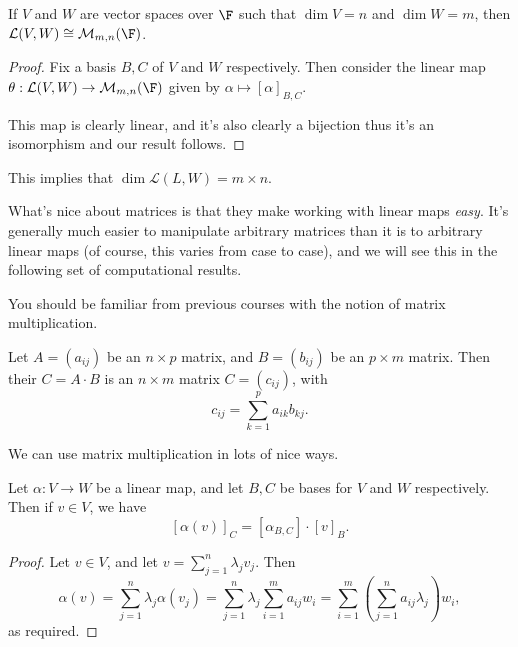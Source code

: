 \documentclass[a4paper]{scrartcl}
\begin{document}
\begin{proposition}
    If $V$ and $W$ are vector spaces over $\F$ such that $\dim V = n$ and $\dim W = m$, then $\mathcal{L}(V, W) \cong \mathcal{M}_{m, n}(\F)$.
\end{proposition}
\begin{proof}
    Fix a basis $B, C$ of $V$ and $W$ respectively.
    Then consider the linear map
    $
    \theta: \mathcal{L}(V, W) \rightarrow \mathcal{M}_{m, n}(\F)
    $ given by $\alpha \mapsto [\alpha]_{B, C}$.

    This map is clearly linear, and it's also clearly a bijection thus it's an isomorphism and our result follows.
\end{proof}

\begin{remark}
    This implies that $\dim \mathcal{L}(L, W) = m \times n$.
\end{remark}


What's nice about matrices is that they make working with linear maps \emph{easy}. It's generally much easier to manipulate arbitrary matrices than it is to arbitrary linear maps (of course, this varies from case to case), and we will see this in the following set of computational results.

You should be familiar from previous courses with the notion of matrix multiplication.

\begin{definition}
    Let $A = (a_{ij})$ be an $n \times p$ matrix, and $B = (b_{ij})$ 
    be an $p \times m$ matrix.
    Then their  $C = A\cdot B$ is an $n \times m$ matrix $C = (c_{ij})$, with
    $$
    c_{ij} = \sum_{k = 1}^p a_{ik}b_{kj}.
    $$
\end{definition}

We can use matrix multiplication in lots of nice ways.

\begin{lemma}
    Let $\alpha: V \rightarrow W$ be a linear map, and let $B, C$ be bases for $V$ and $W$ respectively. Then if $v \in V$, we have
    $$
    [\alpha(v)]_C = [\alpha_{B,C}] \cdot [v]_B.
    $$
\end{lemma}
\begin{proof}
    Let $v \in V$, and let $v = \sum_{j = 1}^n \lambda_j v_j$. Then
    $$
    \alpha(v) = \sum_{j = 1}^n \lambda_j \alpha(v_j) = \sum_{j = 1}^n \lambda_j \sum_{i = 1}^m a_{ij} w_i = \sum_{i = 1}^m \left(\sum_{j = 1}^n a_{ij} \lambda_j\right) w_i,
    $$
    as required.
\end{proof}
\end{document}
